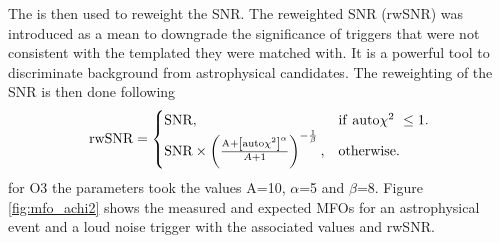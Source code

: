 The \achi is then used to reweight the SNR.
The reweighted SNR (rwSNR) was introduced as a mean to downgrade the significance of triggers that were not consistent with the templated they were matched with.
It is a powerful tool to discriminate background from astrophysical candidates.
The reweighting of the SNR is then done following
%
\begin{equation}
\label{eq:rwsnr}
    \textrm{rwSNR} = \begin{cases}
    \textrm{SNR}, & \textrm{if \textrm{auto$\chi^2$} } \leq 1.\\
    \textrm{SNR} \times \left( \frac{ \textrm{A}+\left[\textrm{auto$\chi^2$}\right]^\alpha }{A+1} \right)^{-\frac{1}{\beta}}, & \text{otherwise}.
  \end{cases}
\end{equation}
%
for O3 the parameters took the values A=10, $\alpha$=5 and $\beta$=8.
Figure \ref{fig:mfo_achi2} shows the measured and expected MFOs for an astrophysical event and a loud noise trigger with the associated \achi values and rwSNR.

